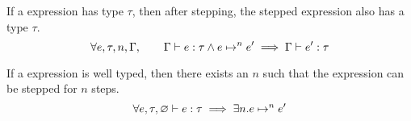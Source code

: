 \begin{theorem}[Preservation]
  If a expression has type \(\tau\), then after stepping, the stepped expression also has a type \(\tau\).
  \[
    \forall e, \tau, n, \Gamma, \qquad
    \TypeEntails{\Gamma}{e}{\tau} \land \RuleStepN{e}{e'}{n} \implies \TypeEntails{\Gamma}{e'}{\tau}
  \]
\end{theorem}

\begin{theorem}[Progress]
  If a expression is well typed, then there exists an \(n\) such that the expression can be stepped for \(n\) steps.
  \[
    \forall e, \tau,
    \TypeEntails{\varnothing}{e}{\tau} \implies \exists n. \RuleStepN{e}{e'}{n}
  \]
\end{theorem}

